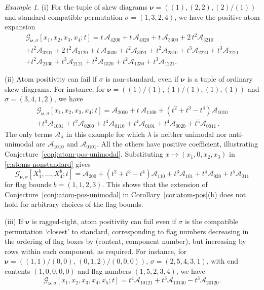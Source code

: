 \documentclass[12pt]{amsart}
\theoremstyle{definition}
\theoremstyle{remark}
\newtheorem{example}[thm]{Example}
\newcommand{\nubold}{{\boldsymbol \nu }}
\newcommand{\Acal}{{\mathcal A}}
\newcommand{\Gcal}{{\mathcal G}}
\begin{document}
\begin{example}\label{ex:atom-pos-standard}
(i) For the tuple of skew diagrams $\nubold = ((1),(2,2),(2)/(1))$ and
standard compatible permutation $\sigma = (1,3,2,4)$, we have the
positive atom expansion
\begin{multline}\label{ex:atom-positive-G}
\Gcal_{\nubold,\sigma}[x_1,x_2,x_3,x_4;t] = t\, \mathcal{A}_{4200} +
t\, \mathcal{A}_{4020} + t\, \mathcal{A}_{3300} + 2\, t^2
\mathcal{A}_{3210}\\
 + t^2 \mathcal{A}_{3201} + 2\, t^2 \mathcal{A}_{3120} + t\,
\mathcal{A}_{3030} + t^2 \mathcal{A}_{3021} + t^2
\mathcal{A}_{2310} + t^3 \mathcal{A}_{2220} + t^3 \mathcal{A}_{2211}\\
 + t^2 \mathcal{A}_{2130} + t^3 \mathcal{A}_{2121} + t^2
\mathcal{A}_{1320} + t^2 \mathcal{A}_{1230} + t^3 \mathcal{A}_{1221}.
\end{multline}

(ii) Atom positivity can fail if $\sigma $ is non-standard, even if
$\nubold $ is a tuple of ordinary skew diagrams.  For instance, for
$\nubold = ((1)/(1),(1)/(1),(1),(1))$ and $\sigma = (3,4,1,2)$, we
have
\begin{multline}\label{e:atoms-nonstandard}
\Gcal_{\nubold,\sigma}[x_1,x_2,x_3,x_4;t] = \Acal_{2000}+t \,
\Acal_{1100}+(t^2 + t^3 -
t^4)\Acal_{1010} \\
+t^3\Acal_{1001}+t^2\Acal_{0200}+t^3\Acal_{0110}+t^4\Acal_{0101}+
t^4\Acal_{0020}+t^5 \Acal_{0011}\, .
\end{multline}
The only terms $\Acal _{\lambda }$ in this example for which $\lambda
$ is neither unimodal nor anti-unimodal are $\Acal _{1010}$ and $\Acal
_{0101}$.  All the others have positive coefficient, illustrating
Conjecture~\ref{conj:atom-pos-unimodal}.
Substituting $x\mapsto
(x_{1},0,x_{2},x_{3})$ in \eqref{e:atoms-nonstandard} gives
\begin{equation}\label{e:atoms-flag-bounds}
\Gcal_{\nubold,\sigma}[X^{b}_1,\ldots, X^{b}_{4};t] = \Acal_{200}+(t^2 + t^3 -
t^4)\Acal_{110} 
+t^3\Acal_{101}+
t^4\Acal_{020}+t^5 \Acal_{011}
\end{equation}
for flag bounds $b = (1,1,2,3)$.  This shows that the extension of
Conjecture~\ref{conj:atom-pos-unimodal} in
Corollary~\ref{cor:atom-pos}(b) does not hold for arbitrary choices of
the flag bounds.


(iii) If $\nubold $ is ragged-right, atom positivity can fail even if
$\sigma $ is the compatible permutation `closest' to standard,
corresponding to flag numbers decreasing in the ordering of flag boxes
by (content, component number), but increasing by rows within each
component, as required.  For instance, for $\nubold =((1,1)/(0,0),\,
(0,1,2)/(0,0,0))$, $\sigma =(2,5,4,3,1)$, with end contents
$(1,0,0,0,0)$ and flag numbers $(1,5,2,3,4)$, we have
\begin{equation}
\Gcal_{\nubold,\sigma}[x_1,x_2,x_3,x_4,x_5;t] = t^4 \Acal _{10121}+t^3
\Acal _{10130}-t^3 \Acal _{20120}.
\end{equation}


\end{example}
\end{document}
